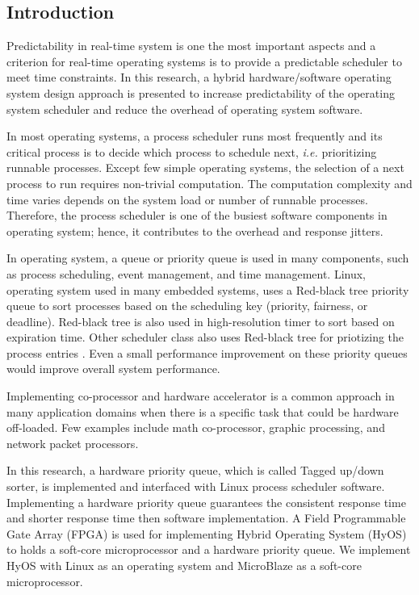 \documentclass[10pt,a4paper]{article}
\begin{document}
\begin{multicols}{2}

\section{Introduction}

Predictability in real-time system is one the most important aspects and a criterion for real-time operating systems is to provide a predictable scheduler to meet time constraints. In this research, a hybrid hardware/software operating system design approach is presented to increase predictability of the operating system scheduler and reduce the overhead of operating system software.

In most operating systems, a process scheduler runs most frequently and its critical process is to decide which process to schedule next, {\it i.e.} prioritizing runnable processes. Except few simple operating systems, the selection of a next process to run requires non-trivial computation. The computation complexity and time varies depends on the system load or number of runnable processes. Therefore, the process scheduler is one of the busiest software components in operating system; hence, it contributes to the overhead and response jitters.

In operating system, a queue or priority queue is used in many components, such as process scheduling, event management, and time management. Linux, operating system used in many embedded systems, uses a Red-black tree priority queue to sort processes based on the scheduling key (priority, fairness, or deadline). Red-black tree is also used in high-resolution timer \cite{hrt} to sort based on expiration time. Other scheduler class also uses Red-black tree for priotizing the process entries \cite{sched_deadline}. Even a small performance improvement on these priority queues would improve overall system performance.

Implementing co-processor and hardware accelerator is a common approach in many application domains when there is a specific task that could be hardware off-loaded. Few examples include math co-processor, graphic processing, and network packet processors.

In this research, a hardware priority queue, which is called Tagged up/down sorter, is implemented and interfaced with Linux process scheduler software. Implementing a hardware priority queue guarantees the consistent response time and shorter response time then software implementation.
A Field Programmable Gate Array (FPGA) is used for implementing Hybrid Operating System (HyOS) to holds a soft-core microprocessor and a hardware priority queue. We implement HyOS with Linux as an operating system and MicroBlaze as a soft-core microprocessor.


\end{multicols}
\end{document}
